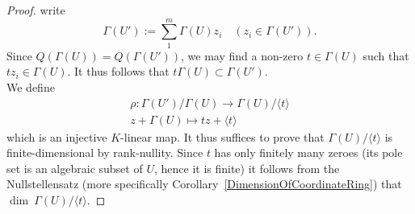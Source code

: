 \begin{proof}
        write 
        $$
            \Gamma(U') := \sum_1^m \Gamma(U)z_i\quad (z_i\in \Gamma(U')).
        $$ 
        Since $Q(\Gamma(U))=Q(\Gamma(U'))$, we may find a non-zero $t\in \Gamma(U)$ such that $tz_i\in \Gamma(U)$. It thus follows that $t\Gamma(U)\subset \Gamma(U')$.\\
        We define 
        \begin{gather*}
            \rho : \Gamma(U')/\Gamma(U) \rightarrow \Gamma(U)/\langle t\rangle\\
            z+ \Gamma(U) \mapsto tz+\langle t\rangle
        \end{gather*}
        which is an injective $K$-linear map. It thus suffices to prove that $\Gamma(U)/\langle t\rangle$ is finite-dimensional by rank-nullity. Since $t$ has only finitely many zeroes (its pole set is an algebraic subset of $U$, hence it is finite) it follows from the Nullstellensatz (more specifically Corollary~\ref{DimensionOfCoordinateRing}) that $\dim \ \Gamma(U)/\langle t\rangle$.  
    \end{proof}
    

